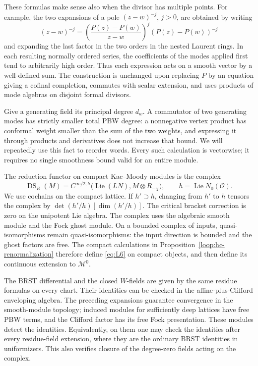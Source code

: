 These formulas make sense also when the divisor has multiple points.
For example, the two expansions of a pole \((z-w)^{-j}\), \(j>0\),
are obtained by writing
\[
 (z-w)^{-j}
 =\left(\frac{P(z)-P(w)}{z-w}\right)^j(P(z)-P(w))^{-j}
\]
and expanding the last factor in the two orders in the nested
Laurent rings.  In each resulting normally ordered series, the
coefficients of the modes applied first tend to arbitrarily high
order.  Thus each expression acts on a smooth vector by a well-defined
sum.  The construction is unchanged upon replacing \(P\) by an
equation giving a cofinal completion, commutes with scalar extension,
and uses products of mode algebras on disjoint formal divisors.

Give a generating field its principal degree \(d_w\).  A commutator
of two generating modes has strictly smaller total PBW degree: a
nonnegative vertex product has conformal weight smaller than the sum
of the two weights, and expressing it through products and derivatives
does not increase that bound.  We will repeatedly use this fact to
reorder words.  Every such calculation is vectorwise; it requires no
single smoothness bound valid for an entire module.

The reduction functor on compact Kac--Moody modules is the complex
\begin{equation}\label{eq:L6}
 \operatorname{DS}_R(M)=
 C^{\infty/2,h}\bigl(\operatorname{Lie}(LN),M\otimes R_{-\chi}\bigr),
 \qquad h=\operatorname{Lie}N_0(\mathcal O).
\end{equation}
We use cochains on the compact lattice.  If \(h'\supset h\),
changing from \(h'\) to \(h\) tensors the complex by
\(\det(h'/h)[\dim(h'/h)]\).  The critical bracket correction is zero
on the unipotent Lie algebra.  The complex uses the algebraic smooth
module and the Fock ghost module.  On a bounded complex of inputs,
quasi-isomorphisms remain quasi-isomorphisms: the input direction is
bounded and the ghost factors are free.  The compact calculations in
Proposition~\ref{loop:hc-renormalization} therefore define
\eqref{eq:L6} on compact objects, and then define its continuous
extension to \(\mathcal M^0\).

The BRST differential and the closed \(W\)-fields are given by the
same residue formulas on every chart.  Their identities can be
checked in the affine-plus-Clifford enveloping algebra.  The preceding
expansions guarantee convergence in the smooth-module topology;
induced modules for sufficiently deep lattices have free PBW terms,
and the Clifford factor has its free Fock presentation.  These
modules detect the identities.  Equivalently, on them one may check
the identities after every residue-field extension, where they are
the ordinary BRST identities in uniformizers.  This also verifies
closure of the degree-zero fields acting on the complex.

